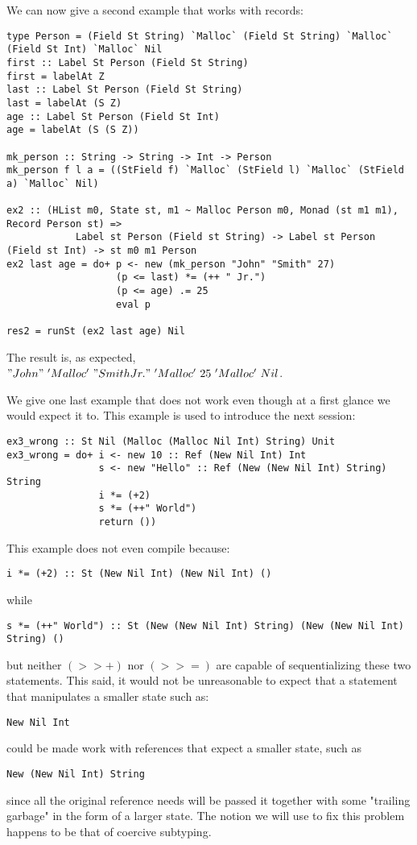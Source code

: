 We can now give a second example that works with records:
\begin{lstlisting}
type Person = (Field St String) `Malloc` (Field St String) `Malloc` (Field St Int) `Malloc` Nil
first :: Label St Person (Field St String)
first = labelAt Z
last :: Label St Person (Field St String)
last = labelAt (S Z)
age :: Label St Person (Field St Int)
age = labelAt (S (S Z))

mk_person :: String -> String -> Int -> Person
mk_person f l a = ((StField f) `Malloc` (StField l) `Malloc` (StField a) `Malloc` Nil)

ex2 :: (HList m0, State st, m1 ~ Malloc Person m0, Monad (st m1 m1), Record Person st) => 
            Label st Person (Field st String) -> Label st Person (Field st Int) -> st m0 m1 Person
ex2 last age = do+ p <- new (mk_person "John" "Smith" 27)
                   (p <= last) *= (++ " Jr.")
                   (p <= age) .= 25
                   eval p

res2 = runSt (ex2 last age) Nil
\end{lstlisting}
The result is, as expected, $"John"\ 'Malloc'\ "Smith Jr."\ 'Malloc'\ 25\ 'Malloc'\ Nil$.

We give one last example that does not work even though at a first glance we would expect it to. This example is used to introduce the next session:
\begin{lstlisting}
ex3_wrong :: St Nil (Malloc (Malloc Nil Int) String) Unit
ex3_wrong = do+ i <- new 10 :: Ref (New Nil Int) Int
                s <- new "Hello" :: Ref (New (New Nil Int) String) String
                i *= (+2)
                s *= (++" World")
                return ())
\end{lstlisting}

This example does not even compile because:
\begin{lstlisting}
i *= (+2) :: St (New Nil Int) (New Nil Int) ()
\end{lstlisting}

while
\begin{lstlisting}
s *= (++" World") :: St (New (New Nil Int) String) (New (New Nil Int) String) ()
\end{lstlisting}

but neither $(>>+)$ nor $(>>=)$ are capable of sequentializing these two statements. This said, it would 
not be unreasonable to expect that a statement that manipulates a smaller state such as:
\begin{lstlisting}
New Nil Int
\end{lstlisting}

could be made work with references that expect a smaller state, such as
\begin{lstlisting}
New (New Nil Int) String
\end{lstlisting}

since all the original reference needs will be passed it together with some "trailing garbage" in the form of a larger state. The notion we will use to fix this problem  happens to be that of coercive subtyping.